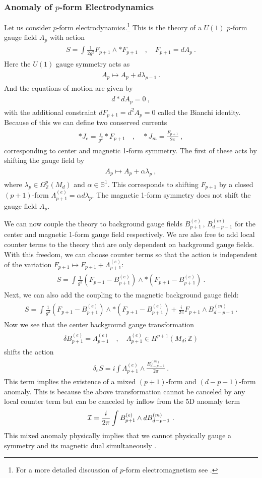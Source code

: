 \documentclass[11pt]{article}
\newcommand{\eq}[1]{\begin{align}\begin{split}#1\end{split}\end{align}}
\newcommand{\twopi}[1]{{\frac{#1}{2\pi}}}
\def\CI {{\cal I}}
\def\CI {{{\cal I}}}
\def\IS{{\mathbb{S}}}
\def\IZ{{\mathbb{Z}}}
\begin{document}
\subsubsection{Anomaly of $p$-form Electrodynamics}

Let us consider $p$-form electrodynamics.\footnote{For a more detailed discussion of $p$-form electromagnetism see \cite{Freed:2006yc,Freed:2006ya}.} This is the theory of a $U(1)$ $p$-form gauge field $A_p$ with action 
\eq{
S=\int \frac{1}{2g^2}F_{p+1}\wedge \ast F_{p+1}\quad, \quad F_{p+1}=dA_p~. 
}
Here the $U(1)$ gauge symmetry acts as 
\eq{
A_p\longmapsto A_p+d\lambda_{p-1}~.
}
And the equations of motion are given by 
\eq{
d\ast d A_p=0~,
}
with the additional constraint $d F_{p+1}=d^2 A_p=0$ called the Bianchi identity. Because of this we can define two conserved currents 
\eq{
\ast J_e=\frac{i}{g^2}\ast F_{p+1}\quad, \quad \ast J_m= \twopi{F_{p+1}}~,
}
corresponding to center and magnetic 1-form  symmetry. The first of these acts by shifting the gauge field by 
\eq{
A_p\longmapsto A_p+\alpha \lambda_p~,
}
where $\lambda_p\in \Omega^p_\IZ(M_d)$ and $\alpha \in  \IS^1  $. 
This corresponds to shifting $F_{p+1}$ by a closed $(p+1)$-form $\Lambda^{(e)}_{p+1}=\alpha d\lambda_p$. 
The magnetic 1-form  symmetry does not shift the gauge field $A_p$. 

We can now couple the theory  to background gauge fields $B_{p+1}^{(e)}\,,\,B_{d-p-1}^{(m)}$ for the center and magnetic 1-form  gauge field respectively. We are also free to add local counter terms to the theory that are only dependent on background gauge fields. With this freedom, we can choose counter terms so that the action is independent of the variation $F_{p+1}\longmapsto F_{p+1}+\Lambda^{(e)}_{p+1}$:
\eq{
S=\int \frac{1}{g^2}(F_{p+1}-B_{p+1}^{(e)})\wedge \ast(F_{p+1}-B_{p+1}^{(e)})~. 
}
Next, we can also add the coupling to the magnetic background gauge field:
\eq{
S=\int \frac{1}{g^2}(F_{p+1}-B_{p+1}^{(e)})\wedge \ast (F_{p+1}-B_{p+1}^{(e)})+\twopi{i} F_{p+1}\wedge B_{d-p-1}^{(m)}~. 
}
Now we see that the center background gauge transformation
\eq{
\delta  B_{p+1}^{(e)}=\Lambda^{(e)}_{p+1}\quad, \quad\Lambda^{(e)}_{p+1}\in H^{p+1}(M_d;\IZ)
}
 shifts the action 
\eq{
\delta_e S=i\int \Lambda^{(e)}_{p+1}\wedge \twopi{B^{(m)}_{d-p-1}}~.
}
This term implies the existence of a mixed $(p+1)$-form and $(d-p-1)$-form anomaly. This is because the above transformation cannot be canceled by any local counter term but can be canceled by inflow from the 5D anomaly term 
\eq{\label{mixedEManom}
\CI=\twopi{i} \int B_{p+1}^{(e)}\wedge dB^{(m)}_{d-p-1}~. 
}
This mixed anomaly physically implies that we cannot physically gauge a symmetry and  its magnetic dual simultaneously \cite{Gaiotto:2014kfa}. \\
\end{document}
